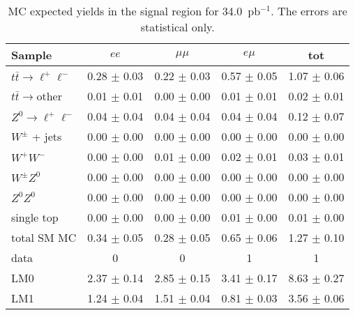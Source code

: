 \begin{table}[hbt]
\begin{center}
\caption{\label{tab:sigyield} MC expected yields in the signal region for 34.0~pb$^{-1}$.
The errors are statistical only.}
\begin{tabular}{lcccc}
\hline
              Sample                     &                $ee$   &            $\mu\mu$   &              $e\mu$   &                 tot  \\
\hline
$t\bar{t}\rightarrow \ell^{+}\ell^{-}$   &     0.28 $\pm$ 0.03   &     0.22 $\pm$ 0.03   &     0.57 $\pm$ 0.05   &     1.07 $\pm$ 0.06  \\
$t\bar{t}\rightarrow \mathrm{other}$     &     0.01 $\pm$ 0.01   &     0.00 $\pm$ 0.00   &     0.01 $\pm$ 0.01   &     0.02 $\pm$ 0.01  \\
$Z^0 \rightarrow \ell^{+}\ell^{-}$       &     0.04 $\pm$ 0.04   &     0.04 $\pm$ 0.04   &     0.04 $\pm$ 0.04   &     0.12 $\pm$ 0.07  \\
    $W^{\pm}$ + jets                     &     0.00 $\pm$ 0.00   &     0.00 $\pm$ 0.00   &     0.00 $\pm$ 0.00   &     0.00 $\pm$ 0.00  \\
            $W^+W^-$                     &     0.00 $\pm$ 0.00   &     0.01 $\pm$ 0.00   &     0.02 $\pm$ 0.01   &     0.03 $\pm$ 0.01  \\
        $W^{\pm}Z^0$                     &     0.00 $\pm$ 0.00   &     0.00 $\pm$ 0.00   &     0.00 $\pm$ 0.00   &     0.00 $\pm$ 0.00  \\
            $Z^0Z^0$                     &     0.00 $\pm$ 0.00   &     0.00 $\pm$ 0.00   &     0.00 $\pm$ 0.00   &     0.00 $\pm$ 0.00  \\
          single top                     &     0.00 $\pm$ 0.00   &     0.00 $\pm$ 0.00   &     0.01 $\pm$ 0.00   &     0.01 $\pm$ 0.00  \\
\hline
         total SM MC                     &     0.34 $\pm$ 0.05   &     0.28 $\pm$ 0.05   &     0.65 $\pm$ 0.06   &     1.27 $\pm$ 0.10  \\
\hline
                data                     &                   0   &                   0   &                   1   &                   1  \\
\hline
                 LM0                     &     2.37 $\pm$ 0.14   &     2.85 $\pm$ 0.15   &     3.41 $\pm$ 0.17   &     8.63 $\pm$ 0.27  \\
                 LM1                     &     1.24 $\pm$ 0.04   &     1.51 $\pm$ 0.04   &     0.81 $\pm$ 0.03   &     3.56 $\pm$ 0.06  \\

\hline
\end{tabular}
\end{center}
\end{table}